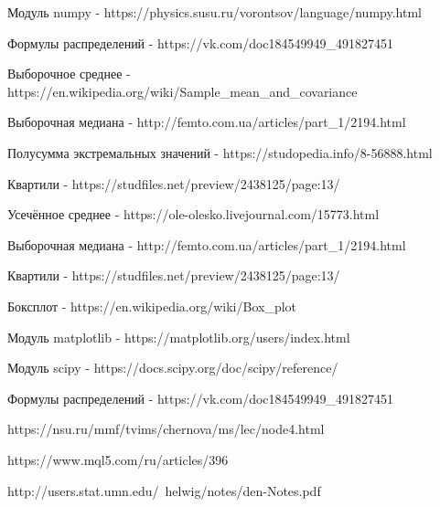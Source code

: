 \documentclass[a4]{article}
\begin{document}
\begin{thebibliography}{}

       Модуль numpy  -  https://physics.susu.ru/vorontsov/language/numpy.html
    
    Формулы распределений  -  https://vk.com/doc184549949\_491827451
    
    Выборочное среднее  -  https://en.wikipedia.org/wiki/Sample\_mean\_and\_covariance
    
    Выборочная медиана  -  http://femto.com.ua/articles/part\_1/2194.html
    
    Полусумма экстремальных значений  -  https://studopedia.info/8-56888.html
    
    Квартили  -  https://studfiles.net/preview/2438125/page:13/
    
      Усечённое среднее  -  https://ole-olesko.livejournal.com/15773.html
    
    
    
    Выборочная медиана  -  http://femto.com.ua/articles/part\_1/2194.html
    
    Квартили -  https://studfiles.net/preview/2438125/page:13/
    
    Боксплот - https://en.wikipedia.org/wiki/Box\_plot
    
    
    
    
    
    Модуль matplotlib - https://matplotlib.org/users/index.html
    
    Модуль scipy - https://docs.scipy.org/doc/scipy/reference/
    
    Формулы распределений  -  https://vk.com/doc184549949\_491827451
    
    https://nsu.ru/mmf/tvims/chernova/ms/lec/node4.html
    
    https://www.mql5.com/ru/articles/396
    
    http://users.stat.umn.edu/~helwig/notes/den-Notes.pdf
    
    
\end{thebibliography}
\end{document}
